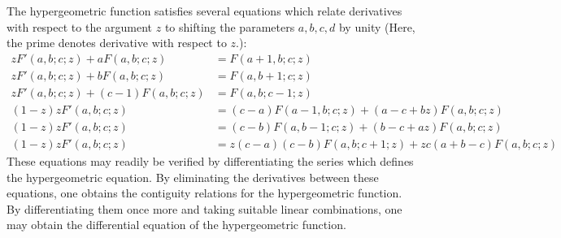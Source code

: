 \documentclass[12pt]{article}
\begin{document}
The hypergeometric function satisfies several equations which
relate derivatives with respect to the argument $z$ to
shifting the parameters $a, b, c, d$ by unity (Here, the
prime denotes derivative with respect to $z$.):
\begin{align*}
z F' (a, b; c; z) + a F (a, b; c; z) &= F (a+1, b; c; z) \\
z F' (a, b; c; z) + b F (a, b; c; z) &= F (a, b+1; c; z) \\
z F' (a, b; c; z) + (c-1) F (a, b; c; z) &= F (a, b; c-1; z) \\
(1 - z) z F' (a, b; c; z) &= (c - a) F (a-1, b; c; z) + (a - c + bz) F (a, b; c; z) \\
(1 - z) z F' (a, b; c; z) &= (c - b) F (a, b-1; c; z) + (b - c + az) F (a, b; c; z) \\
(1 - z) z F' (a, b; c; z) &= z (c - a) (c - b) F (a, b; c+1; z) +
zc (a + b - c) F (a, b; c; z)
\end{align*}
These equations may readily be verified by differentiating the series
which defines the hypergeometric equation.  By eliminating the derivatives
between these equations, one obtains the contiguity relations for the 
hypergeometric function.  By differentiating them once more and taking
suitable linear combinations, one may obtain the differential equation
of the hypergeometric function.
\end{document}
